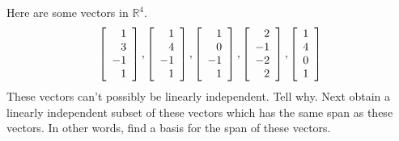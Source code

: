 \begin{enumialphparenastyle}
\begin{ex} Here are some vectors in $\mathbb{R}^{4}$. 
\begin{equation*}
\left[ 
\begin{array}{r}
1 \\ 
3 \\ 
-1 \\ 
1
\end{array}
\right] ,\left[ 
\begin{array}{r}
1 \\ 
4 \\ 
-1 \\ 
1
\end{array}
\right] ,\left[ 
\begin{array}{r}
1 \\ 
0 \\ 
-1 \\ 
1
\end{array}
\right] ,\left[ 
\begin{array}{r}
2 \\ 
-1 \\ 
-2 \\ 
2
\end{array}
\right] ,\left[ 
\begin{array}{r}
1 \\ 
4 \\ 
0 \\ 
1
\end{array}
\right]
\end{equation*}
These vectors can't possibly be linearly independent. Tell why. Next obtain a
linearly independent subset of these vectors which has the same span as
these vectors. In other words, find a basis for the span of these vectors.
\end{ex}


\end{enumialphparenastyle}
